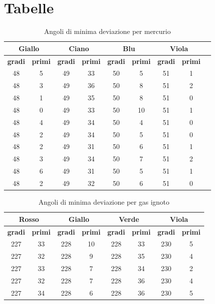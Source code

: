 \documentclass[letterpaper,12pt]{article}
\begin{document}
\newpage
\section{Tabelle}

\begin{table}[h!]
    \centering
    \begin{tabular}{|c|c|c|c|c|c|c|c|c|}
    \hline
    \multicolumn{2}{|c|}{\textbf{Giallo}} & \multicolumn{2}{|c|}{\textbf{Ciano}} & \multicolumn{2}{|c|}{\textbf{Blu}} & \multicolumn{2}{|c|}{\textbf{Viola}} \\
    \hline
    \textbf{gradi} & \textbf{primi} & \textbf{gradi} & \textbf{primi} & \textbf{gradi} & \textbf{primi} & \textbf{gradi} & \textbf{primi} \\
    \hline
    48 & 5 & 49 & 33 & 50 & 5 & 51 & 1 \\
    48 & 3 & 49 & 36 & 50 & 8 & 51 & 2 \\
    48 & 1 & 49 & 35 & 50 & 8 & 51 & 0 \\
    48 & 0 & 49 & 33 & 50 & 10 & 51 & 1 \\
    48 & 4 & 49 & 34 & 50 & 4 & 51 & 0 \\
    48 & 2 & 49 & 34 & 50 & 5 & 51 & 0 \\
    48 & 2 & 49 & 31 & 50 & 6 & 51 & 1 \\
    48 & 3 & 49 & 34 & 50 & 7 & 51 & 2 \\
    48 & 6 & 49 & 31 & 50 & 5 & 51 & 1 \\
    48 & 2 & 49 & 32 & 50 & 6 & 51 & 0 \\
    \hline
    \end{tabular}
    \caption{Angoli di minima deviazione per mercurio}
    \label{tab:prisma_md}
    \end{table}

    \begin{table}[h!]
        \centering
        \begin{tabular}{|c|c|c|c|c|c|c|c|}
        \hline
        \multicolumn{2}{|c|}{\textbf{Rosso}} & \multicolumn{2}{|c|}{\textbf{Giallo}} & \multicolumn{2}{|c|}{\textbf{Verde}} & \multicolumn{2}{|c|}{\textbf{Viola}} \\
        \hline
        \textbf{gradi} & \textbf{primi} & \textbf{gradi} & \textbf{primi} & \textbf{gradi} & \textbf{primi} & \textbf{gradi} & \textbf{primi} \\
        \hline
        227 & 33 & 228 & 10 & 228 & 33 & 230 & 5 \\
        227 & 32 & 228 & 9 & 228 & 35 & 230 & 4 \\
        227 & 33 & 228 & 7 & 228 & 34 & 230 & 2 \\
        227 & 32 & 228 & 7 & 228 & 36 & 230 & 4 \\
        227 & 34 & 228 & 6 & 228 & 36 & 230 & 5 \\
        \hline
        \end{tabular}
        \caption{Angoli di minima deviazione per gas ignoto}
        \label{tab:prisma_md_ignoto}
        \end{table}
        
\end{document}

